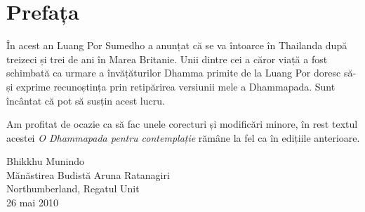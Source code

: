 
\chapter[Prefața ediției a treia (2010)]{Prefața}

În acest an Luang Por Sumedho a anunțat că se va întoarce în Thailanda după treizeci și trei de ani în Marea Britanie. Unii dintre cei a căror viață a fost schimbată ca urmare a învățăturilor Dhamma primite de la Luang Por doresc să-și exprime recunoștința prin retipărirea versiunii mele a Dhammapada. Sunt încântat că pot să susțin acest lucru.

Am profitat de ocazie ca să fac unele corecturi și modificări minore, în rest textul acestei \emph{O Dhammapada pentru contemplație} rămâne la fel ca în edițiile anterioare.

\bigskip

{\raggedleft
Bhikkhu Munindo\\
Mănăstirea Budistă Aruna Ratanagiri\\
Northumberland, Regatul Unit\\
26 mai 2010
\par}

